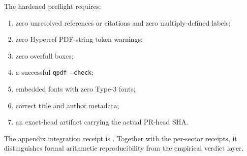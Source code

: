 The hardened preflight requires:
\begin{enumerate}
\item zero unresolved references or citations and zero multiply-defined labels;
\item zero Hyperref PDF-string token warnings;
\item zero overfull boxes;
\item a successful \texttt{qpdf --check};
\item embedded fonts with zero Type-3 fonts;
\item correct title and author metadata;
\item an exact-head artifact carrying the actual PR-head SHA.
\end{enumerate}

The appendix integration receipt is
.
Together with the per-sector receipts, it distinguishes formal arithmetic
reproducibility from the empirical verdict layer.
